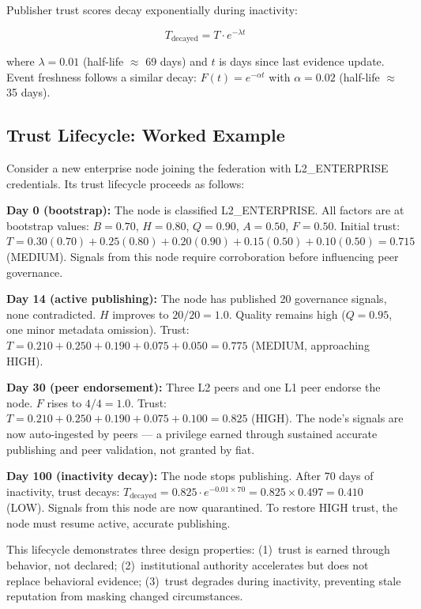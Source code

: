 \documentclass[journal]{IEEEtran}
\begin{document}
Publisher trust scores decay exponentially during inactivity:

\begin{equation}
T_{\text{decayed}} = T \cdot e^{-\lambda t}
\label{eq:decay}
\end{equation}

where $\lambda = 0.01$ (half-life $\approx$ 69 days) and $t$ is days since last evidence update. Event freshness follows a similar decay: $F(t) = e^{-\alpha t}$ with $\alpha = 0.02$ (half-life $\approx$ 35 days).

\subsection{Trust Lifecycle: Worked Example}

Consider a new enterprise node joining the federation with L2\_ENTERPRISE credentials. Its trust lifecycle proceeds as follows:

\textbf{Day 0 (bootstrap):} The node is classified L2\_ENTERPRISE. All factors are at bootstrap values: $B = 0.70$, $H = 0.80$, $Q = 0.90$, $A = 0.50$, $F = 0.50$. Initial trust: $T = 0.30(0.70) + 0.25(0.80) + 0.20(0.90) + 0.15(0.50) + 0.10(0.50) = 0.715$ (MEDIUM). Signals from this node require corroboration before influencing peer governance.

\textbf{Day 14 (active publishing):} The node has published 20 governance signals, none contradicted. $H$ improves to $20/20 = 1.0$. Quality remains high ($Q = 0.95$, one minor metadata omission). Trust: $T = 0.210 + 0.250 + 0.190 + 0.075 + 0.050 = 0.775$ (MEDIUM, approaching HIGH).

\textbf{Day 30 (peer endorsement):} Three L2 peers and one L1 peer endorse the node. $F$ rises to $4/4 = 1.0$. Trust: $T = 0.210 + 0.250 + 0.190 + 0.075 + 0.100 = 0.825$ (HIGH). The node's signals are now auto-ingested by peers --- a privilege earned through sustained accurate publishing and peer validation, not granted by fiat.

\textbf{Day 100 (inactivity decay):} The node stops publishing. After 70 days of inactivity, trust decays: $T_{\text{decayed}} = 0.825 \cdot e^{-0.01 \times 70} = 0.825 \times 0.497 = 0.410$ (LOW). Signals from this node are now quarantined. To restore HIGH trust, the node must resume active, accurate publishing.

This lifecycle demonstrates three design properties: (1)~trust is earned through behavior, not declared; (2)~institutional authority accelerates but does not replace behavioral evidence; (3)~trust degrades during inactivity, preventing stale reputation from masking changed circumstances.
\end{document}

